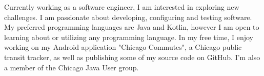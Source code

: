 
\begin{cvsynopsis}

\cvparagraph

Currently working as a software engineer, I am interested in exploring new challenges. I am passionate about developing, configuring and testing software. My preferred programming languages are Java and Kotlin, however I am open to learning about or utilizing any programming language. In my free time, I enjoy working on my Android application "Chicago Commutes", a Chicago public transit tracker, as well as publishing some of my source code on GitHub. I'm also a member of the Chicago Java User group.


\end{cvsynopsis}
